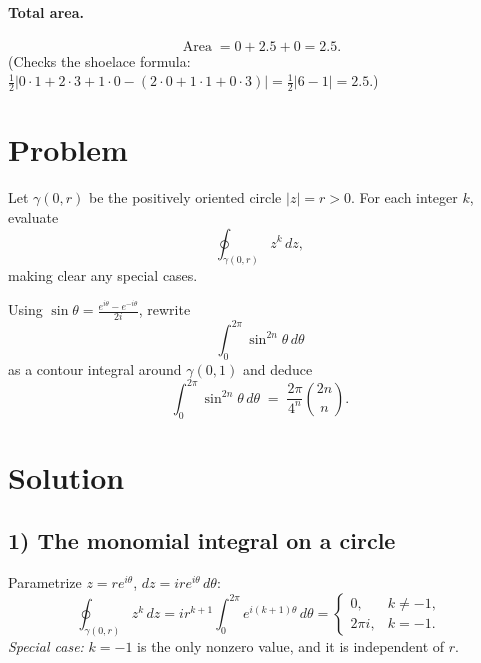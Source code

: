 \documentclass[11pt]{article}
\begin{document}
\paragraph{Total area.}
\[
\operatorname{Area}=0+2.5+0=\boxed{2.5}.
\]
(Checks the shoelace formula:
\(\displaystyle \tfrac12\bigl|0\cdot1+2\cdot3+1\cdot0-(2\cdot0+1\cdot1+0\cdot3)\bigr|
=\tfrac12|6-1|=2.5\).)

\section*{Problem}
Let $\gamma(0,r)$ be the positively oriented circle $\lvert z\rvert=r>0$.
For each integer $k$, evaluate
\[
\oint_{\gamma(0,r)} z^{k}\,dz,
\]
making clear any special cases.

Using $\displaystyle \sin\theta=\frac{e^{i\theta}-e^{-i\theta}}{2i}$, rewrite
\[
\int_{0}^{2\pi}\sin^{2n}\theta\,d\theta
\]
as a contour integral around $\gamma(0,1)$ and deduce
\[
\int_{0}^{2\pi}\sin^{2n}\theta\,d\theta \;=\; \frac{2\pi}{4^n}\binom{2n}{n}.
\]

\section*{Solution}
\subsection*{1) The monomial integral on a circle}
Parametrize $z=re^{i\theta}$, $dz=i r e^{i\theta}\,d\theta$:
\[
\oint_{\gamma(0,r)} z^k\,dz
= i r^{k+1}\!\int_{0}^{2\pi} e^{i(k+1)\theta}\,d\theta
=
\begin{cases}
	0, & k\neq -1,\\[4pt]
	2\pi i, & k=-1.
\end{cases}
\]
\emph{Special case:} $k=-1$ is the only nonzero value, and it is independent of $r$.
\end{document}

